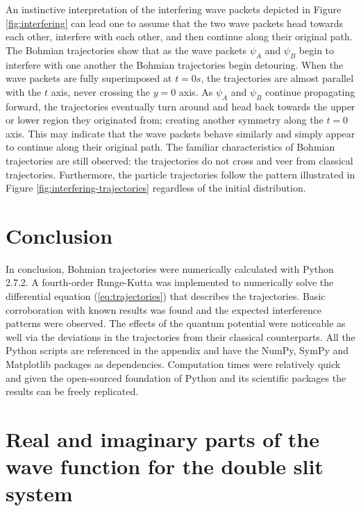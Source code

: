 \documentclass[10pt, reqno]{article}
\begin{document}
  An instinctive interpretation of the interfering wave packets depicted in Figure \ref{fig:interfering} can lead one to assume that the two wave packets 
    head towards each other, interfere with each other, and then continue along their original path.
  The Bohmian trajectories show that as the wave packets $\psi_A$ and $\psi_B$ begin to interfere with one another the Bohmian trajectories begin detouring.
  When the wave packets are fully superimposed at $t=0s$, the trajectories are almost parallel with the $t$ axis, never crossing the $y=0$ axis. 
  As $\psi_A$ and $\psi_B$ continue propagating forward, the trajectories eventually turn around and head back towards the upper or lower region they originated from;
    creating another symmetry along the $t=0$ axis.
  This may indicate that the wave packets behave similarly and simply appear to continue along their original path.
  The familiar characteristics of Bohmian trajectories are still observed: the trajectories do not cross and veer from classical trajectories.
  Furthermore, the particle trajectories follow the pattern illustrated in Figure \ref{fig:interfering-trajectories} regardless of the initial distribution.

\section{Conclusion}

  In conclusion, Bohmian trajectories were numerically calculated with Python 2.7.2.
  A fourth-order Runge-Kutta was implemented to numerically solve the differential equation (\ref{eq:trajectories}) that describes the trajectories.
  Basic corroboration with known results was found and the expected interference patterns were observed.
  The effects of the quantum potential were noticeable as well via the deviations in the trajectories from their classical counterparts.
  All the Python scripts are referenced in the appendix and have the NumPy, SymPy and Matplotlib packages as dependencies.
  Computation times were relatively quick and given the open-sourced foundation of Python and its scientific packages the results can be freely replicated.

\pagebreak




\pagebreak

\appendix
{}

\section{Real and imaginary parts of the wave function for the double slit system}
\label{appendix:real-imag}

\pagebreak
\end{document}
